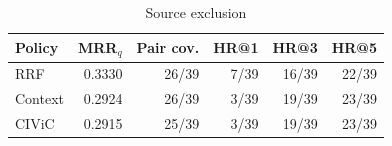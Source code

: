 \begin{table}[t]
\centering
\caption{Source exclusion}
\label{tab:source-exclusion}
\small
\setlength{\tabcolsep}{3.5pt}
\begin{tabular}{lrrrrr}
\toprule
Policy & MRR$_q$ & Pair cov. & HR@1 & HR@3 & HR@5 \\
\midrule
RRF & 0.3330 & 26/39 & 7/39 & 16/39 & 22/39 \\
Context & 0.2924 & 26/39 & 3/39 & 19/39 & 23/39 \\
CIViC & 0.2915 & 25/39 & 3/39 & 19/39 & 23/39 \\
\bottomrule
\end{tabular}
\end{table}
